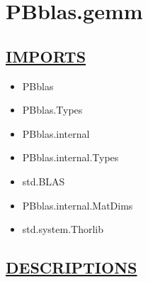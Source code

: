 \chapter*{PBblas.gemm}
\hypertarget{PBblas.gemm}{}

\section*{\underline{IMPORTS}}
\begin{itemize}
\item PBblas
\item PBblas.Types
\item PBblas.internal
\item PBblas.internal.Types
\item std.BLAS
\item PBblas.internal.MatDims
\item std.system.Thorlib
\end{itemize}

\section*{\underline{DESCRIPTIONS}}
